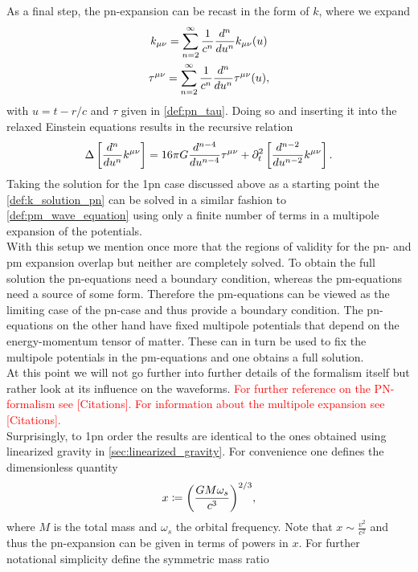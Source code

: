 As a final step, the \gls{pn}-expansion can be recast in the form of $k$, where we expand
\begin{gather}
k_{\mu\nu} =\sum_{n=2}^\infty \frac{1}{c^n}\frac{d^n}{du^n}k_{\mu\nu}{\left( u \right)}\\
\tau^{\mu\nu}=\sum_{n=2}^\infty \frac{1}{c^n}\frac{d^n}{du^n}\tau^{\mu\nu}{\left( u \right)},
\end{gather}
with $u=t-r/c$ and $\tau$ given in \eqref{def:pn_tau}. Doing so and inserting it into the relaxed Einstein equations results in the recursive relation
\begin{equation}\label{def:k_solution_pn}
\Delta\left[\frac{d^n}{du^n}k^{\mu\nu}\right]=16\pi G\frac{d^{n-4}}{du^{n-4}}\tau^{\mu\nu}+\partial_t^2\left[\frac{d^{n-2}}{du^{n-2}}k^{\mu\nu}\right].
\end{equation}
Taking the solution for the 1\gls{pn} case discussed above as a starting point the \eqref{def:k_solution_pn} can be solved in a similar fashion to \eqref{def:pm_wave_equation} using only a finite number of terms in a multipole expansion of the potentials.\medskip\\
With this setup we mention once more that the regions of validity for the \gls{pn}- and \gls{pm} expansion overlap but neither are completely solved. To obtain the full solution the \gls{pn}-equations need a boundary condition, whereas the \gls{pm}-equations need a source of some form. Therefore the \gls{pm}-equations can be viewed as the limiting case of the \gls{pn}-case and thus provide a boundary condition. The \gls{pn}-equations on the other hand have fixed multipole potentials that depend on the energy-momentum tensor of matter. These can in turn be used to fix the multipole potentials in the \gls{pm}-equations and one obtains a full solution.\\
At this point we will not go further into further details of the formalism itself but rather look at its influence on the waveforms. \textcolor{red}{For further reference on the PN-formalism see [Citations]. For information about the multipole expansion see [Citations].}\medskip\\
Surprisingly, to 1\gls{pn} order the results are identical to the ones obtained using linearized gravity in \autoref{sec:linearized_gravity}. For convenience one defines the dimensionless quantity
\begin{equation}
x\coloneqq {\left( \frac{G M \omega_s}{c^3} \right)}^{2/3},
\end{equation}
where $M$ is the total mass and $\omega_s$ the orbital frequency. Note that $x\sim \frac{v^2}{c^2}$ and thus the \gls{pn}-expansion can be given in terms of powers in $x$. For further notational simplicity define the symmetric mass ratio
